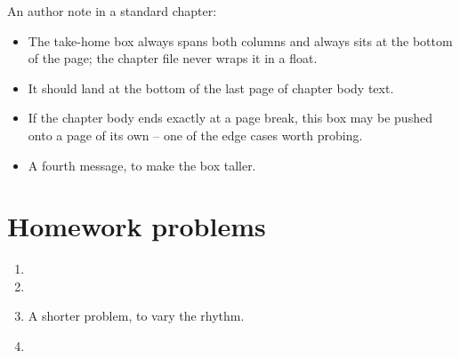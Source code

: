 \lipsum[42-43]

An author note in a standard chapter: 

\lipsum[10-15]


\begin{boxmessages}
\begin{itemize}
\item The take-home box always spans both columns and always sits at the
      bottom of the page; the chapter file never wraps it in a float.
\item It should land at the bottom of the last page of chapter body text.
\item If the chapter body ends exactly at a page break, this box may be
      pushed onto a page of its own -- one of the edge cases worth probing.
\item A fourth message, to make the box taller.
\end{itemize}
\end{boxmessages}

\chapterhardbreak
\section*{Homework problems}

\begin{enumerate}
\item \lipsum[46]
\item \lipsum[47]
\item A shorter problem, to vary the rhythm.
\item \lipsum[48]
\end{enumerate}